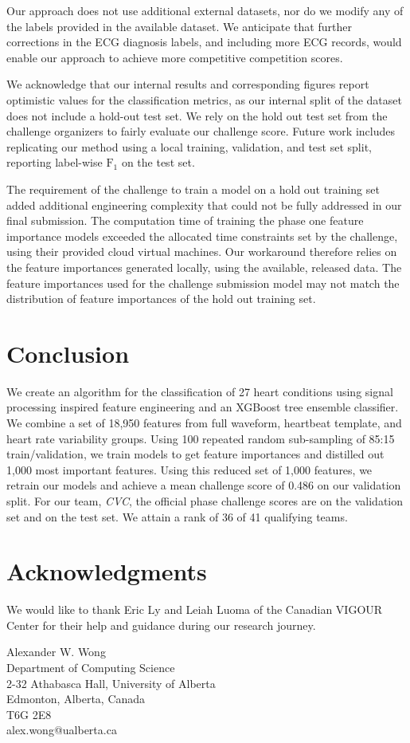 \documentclass[twocolumn]{cinc}
\begin{document}
Our approach does not use additional external datasets, nor do we modify any of the labels provided in the available dataset.
We anticipate that further corrections in the ECG diagnosis labels, and including more ECG records, would enable our approach to achieve more competitive competition scores.

We acknowledge that our internal results and corresponding figures report optimistic values for the classification metrics, as our internal split of the dataset does not include a hold-out test set.
We rely on the hold out test set from the challenge organizers to fairly evaluate our challenge score.
Future work includes replicating our method using a local training, validation, and test set split, reporting label-wise $\text{F}_1$ on the test set.

The requirement of the challenge to train a model on a hold out training set added additional engineering complexity that could not be fully addressed in our final submission.
The computation time of training the phase one feature importance models exceeded the allocated time constraints set by the challenge, using their provided cloud virtual machines.
Our workaround therefore relies on the feature importances generated locally, using the available, released data.
The feature importances used for the challenge submission model may not match the distribution of feature importances of the hold out training set.

\section{Conclusion}

We create an algorithm for the classification of 27 heart conditions using signal processing inspired feature engineering and an XGBoost tree ensemble classifier.
We combine a set of 18,950 features from full waveform, heartbeat template, and heart rate variability groups.
Using 100 repeated random sub-sampling of 85:15 train/validation, we train models to get feature importances and distilled out 1,000 most important features.
Using this reduced set of 1,000 features, we retrain our models and achieve a mean challenge score of 0.486 on our validation split.
For our team, \emph{CVC}, the official phase challenge scores are \officialvalscore on the validation set and \officialtestscore on the test set.
We attain a rank of 36 of 41 qualifying teams.


\section*{Acknowledgments}
We would like to thank Eric Ly and Leiah Luoma of the Canadian VIGOUR Center for their help and guidance during our research journey.



\begin{correspondence}
Alexander W. Wong\\
Department of Computing Science\\
2-32 Athabasca Hall, University of Alberta\\
Edmonton, Alberta, Canada\\
T6G 2E8\\
alex.wong@ualberta.ca
\end{correspondence}
\end{document}
